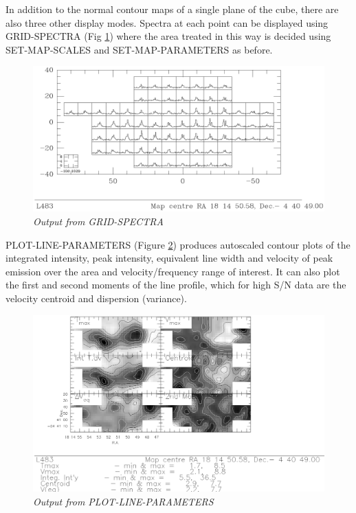 \documentclass[11pt,twoside]{report}
\begin{document}
In addition to the normal contour maps of a single plane of the cube, there are
also three other display modes. Spectra at each point can be displayed using
GRID-SPECTRA (Fig \ref{GRID}) where the area treated in this way is decided
using SET-MAP-SCALES and SET-MAP-PARAMETERS as before. 
\begin{figure}[htbp]
\begin{center}
\includegraphics[scale=0.65]{grid-spec.ps}
\protect\parbox{5.5in}
{\caption[GRID]
{\sl
Output from GRID-SPECTRA
\label{GRID}
}
}
\end{center}
\end{figure}

PLOT-LINE-PARAMETERS (Figure \ref{PLP}) produces autoscaled contour plots of
the integrated intensity, peak intensity, equivalent line width and velocity of
peak emission over the area and velocity/frequency range of interest. It can
also plot the first and second moments of the line profile, which for high
S/N data are the velocity centroid and dispersion (variance).
\begin{figure}[htbp]
\begin{center}
\includegraphics[scale=0.8]{plot-l-p.ps}
\protect\parbox{5.5in}
{\caption[PLP]
{\sl
Output from PLOT-LINE-PARAMETERS
\label{PLP}
}
}
\end{center}
\end{figure}
\end{document}

